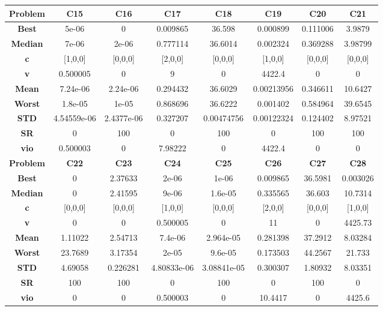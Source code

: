 \documentclass{IEEEtran}
\begin{document}
\begin{center}
\begin{tabular}{|c|c|c|c|c|c|c|c|}
    \hline 
    \hline 
    \textbf{Problem} & \textbf{C15} & \textbf{C16} & \textbf{C17} & \textbf{C18} & \textbf{C19} & \textbf{C20} & \textbf{C21} \\ 
    \hline\hline 
    \textbf{Best} & 5e-06 & 0 & 0.009865 & 36.598 & 0.000899 & 0.111006 & 3.9879\\ 
    \textbf{Median} & 7e-06 & 2e-06 & 0.777114 & 36.6014 & 0.002324 & 0.369288 & 3.98799\\ 
    \textbf{c} & [1,0,0] & [0,0,0] & [2,0,0] & [0,0,0] & [1,0,0] & [0,0,0] & [0,0,0]\\ 
    \textbf{v} & 0.500005 & 0 & 9 & 0 & 4422.4 & 0 & 0\\ 
    \textbf{Mean} & 7.24e-06 & 2.24e-06 & 0.294432 & 36.6029 & 0.00213956 & 0.346611 & 10.6427\\ 
    \textbf{Worst} & 1.8e-05 & 1e-05 & 0.868696 & 36.6222 & 0.001402 & 0.584964 & 39.6545\\ 
    \textbf{STD} & 4.54559e-06 & 2.4377e-06 & 0.327207 & 0.00474756 & 0.00122324 & 0.124402 & 8.97521\\ 
    \textbf{SR} & 0 & 100 & 0 & 100 & 0 & 100 & 100\\ 
    \textbf{vio} & 0.500003 & 0 & 7.98222 & 0 & 4422.4 & 0 & 0\\ 
    \hline 
    \hline 
    \textbf{Problem} & \textbf{C22} & \textbf{C23} & \textbf{C24} & \textbf{C25} & \textbf{C26} & \textbf{C27} & \textbf{C28} \\ 
    \hline\hline 
    \textbf{Best} & 0 & 2.37633 & 2e-06 & 1e-06 & 0.009865 & 36.5981 & 0.003026\\ 
    \textbf{Median} & 0 & 2.41595 & 9e-06 & 1.6e-05 & 0.335565 & 36.603 & 10.7314\\ 
    \textbf{c} & [0,0,0] & [0,0,0] & [1,0,0] & [0,0,0] & [2,0,0] & [0,0,0] & [1,0,0]\\ 
    \textbf{v} & 0 & 0 & 0.500005 & 0 & 11 & 0 & 4425.73\\ 
    \textbf{Mean} & 1.11022 & 2.54713 & 7.4e-06 & 2.964e-05 & 0.281398 & 37.2912 & 8.03284\\ 
    \textbf{Worst} & 23.7689 & 3.17354 & 2e-05 & 9.6e-05 & 0.173503 & 44.2567 & 21.733\\ 
    \textbf{STD} & 4.69058 & 0.226281 & 4.80833e-06 & 3.08841e-05 & 0.300307 & 1.80932 & 8.03351\\ 
    \textbf{SR} & 100 & 100 & 0 & 100 & 0 & 100 & 0\\ 
    \textbf{vio} & 0 & 0 & 0.500003 & 0 & 10.4417 & 0 & 4425.6\\ 
    \hline 
  \end{tabular}
\end{center}
\newpage
\end{document}
